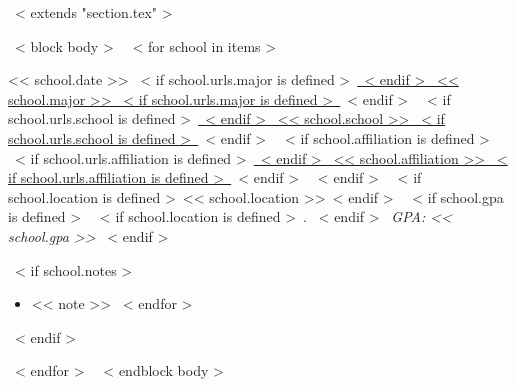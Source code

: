 ~< extends "section.tex" >~

~< block body >~
  ~< for school in items >~
    \begin{samepage}
      \cventry
        {<< school.date >>}
        {~< if school.urls.major is defined >~\href{school.urls.major}{~< endif >~%
           << school.major >>%
         ~< if school.urls.major is defined >~}~< endif >~}
        {~< if school.urls.school is defined >~\href{school.urls.school}{~< endif >~%
           << school.school >>%
         ~< if school.urls.school is defined >~}~< endif >~}
        {~< if school.affiliation is defined >~%
           ~< if school.urls.affiliation is defined >~\href{school.urls.affiliation}{~< endif >~%
             << school.affiliation >>%
           ~< if school.urls.affiliation is defined >~}~< endif >~%
         ~< endif >~}
        {~< if school.location is defined >~<< school.location >>~< endif >~%
         ~< if school.gpa is defined >~%
           ~< if school.location is defined >~. ~< endif >~%
           \textit{GPA: << school.gpa >>}%
         ~< endif >~}
        {~< if school.notes >~\begin{itemize}
             ~< for note in school.notes >~
               \item{<< note >>}
             ~< endfor >~
           \end{itemize}~< endif >~}
    \end{samepage}
  ~< endfor >~
~< endblock body >~
